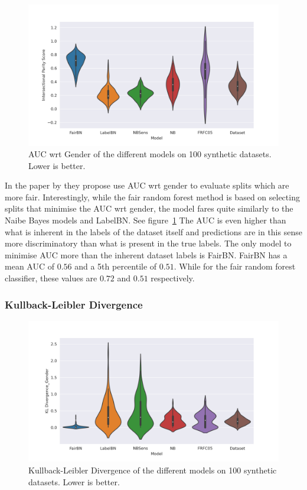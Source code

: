 \begin{figure}
    \centering
    \includegraphics[width=\linewidth]{figures/intparscore-synthetic.png}
    \caption{AUC wrt Gender of the different models on 100 synthetic datasets. Lower is better.}
    \label{fig:aucgender}
\end{figure}

In the paper by \citet{Antonio:2021:arXiv} they propose use AUC wrt gender to evaluate splits which are more fair. Interestingly, while the fair random forest method is based on selecting splits that minimise the AUC wrt gender, the model fares quite similarly to the Naibe Bayes models and LabelBN. See figure~\ref{fig:aucgender} The AUC is even higher than what is inherent in the labels of the dataset itself and predictions are in this sense more discriminatory than what is present in the true labels. The only model to minimise AUC more than the inherent dataset labels is FairBN. FairBN has a mean AUC of $0.56$ and a 5th percentile of $0.51$. While for the fair random forest classifier, these values are $0.72$ and $0.51$ respectively.

\subsubsection{Kullback-Leibler Divergence}

\begin{figure}
    \centering
    \includegraphics[width=\linewidth]{figures/kldg-synthetic.png}
    \caption{Kullback-Leibler Divergence of the different models on 100 synthetic datasets. Lower is better.}
    \label{fig:kldg-synthetic}
\end{figure}

